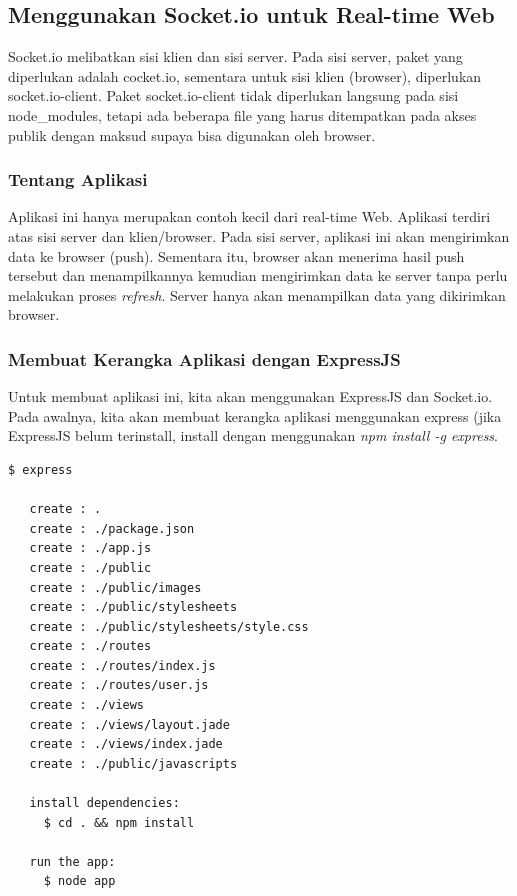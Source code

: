 \subsection{Menggunakan Socket.io untuk Real-time Web}

Socket.io melibatkan sisi klien dan sisi server. Pada sisi server, paket yang diperlukan adalah cocket.io, sementara untuk sisi klien (browser), diperlukan socket.io-client. Paket socket.io-client tidak diperlukan langsung pada sisi node\_modules, tetapi ada beberapa file yang harus ditempatkan pada akses publik dengan maksud supaya bisa digunakan oleh browser. 

\subsubsection{Tentang Aplikasi}

Aplikasi ini hanya merupakan contoh kecil dari real-time Web. Aplikasi terdiri atas sisi server dan klien/browser. Pada sisi server, aplikasi ini akan mengirimkan data ke browser (push). Sementara itu, browser akan menerima hasil push tersebut dan menampilkannya kemudian mengirimkan data ke server tanpa perlu melakukan proses \textit{refresh}. Server hanya akan menampilkan data yang dikirimkan browser. 

\subsubsection{Membuat Kerangka Aplikasi dengan ExpressJS}

Untuk membuat aplikasi ini, kita akan menggunakan ExpressJS dan Socket.io. Pada awalnya, kita akan membuat kerangka aplikasi menggunakan express (jika ExpressJS belum terinstall, install dengan menggunakan \textit{npm install -g express}. 

\lstset{language=Bash,caption=Membuat kerangka aplikasi dengan ExpressJS}
\begin{lstlisting}
$ express 

   create : .
   create : ./package.json
   create : ./app.js
   create : ./public
   create : ./public/images
   create : ./public/stylesheets
   create : ./public/stylesheets/style.css
   create : ./routes
   create : ./routes/index.js
   create : ./routes/user.js
   create : ./views
   create : ./views/layout.jade
   create : ./views/index.jade
   create : ./public/javascripts

   install dependencies:
     $ cd . && npm install

   run the app:
     $ node app
\end{lstlisting}

